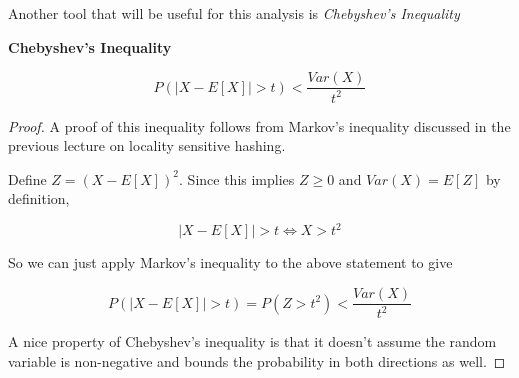 \documentclass[../notes.tex]{subfiles}
\begin{document}
Another tool that will be useful for this analysis is \textit{Chebyshev's Inequality}


\begin{definition}
    \textbf{Chebyshev's Inequality} 

    \begin{equation}
        P(|X - E[X]| > t) < \frac{Var(X) }{t^2}
    \end{equation}


    \begin{proof}
        A proof of this inequality follows from Markov's inequality discussed in the previous lecture on locality sensitive hashing.

        Define $ Z = (X - E[X])^2 $. Since this implies $ Z \ge 0  $ and $ Var(X) = E[Z] $ by definition,

        \begin{equation}
        |X - E[X]| > t \Leftrightarrow X > t^2
        \end{equation}

        So we can just apply Markov's inequality to the above statement to give

        \begin{equation}
            P(|X - E[X]| > t) = P(Z > t^2) < \frac{Var(X) }{t^2}
        \end{equation}

        A nice property of Chebyshev's inequality is that it doesn't assume the random variable is non-negative and bounds the probability in both directions as well.
    \end{proof}
\end{definition}
\end{document}
